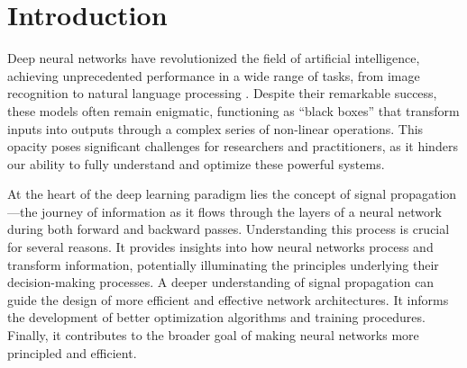 \chapter{Introduction}

Deep neural networks have revolutionized the field of artificial intelligence, achieving unprecedented performance in a wide range of tasks, from image recognition to natural language processing \cite{zhang2019root}. Despite their remarkable success, these models often remain enigmatic, functioning as ``black boxes'' that transform inputs into outputs through a complex series of non-linear operations. This opacity poses significant challenges for researchers and practitioners, as it hinders our ability to fully understand and optimize these powerful systems.

At the heart of the deep learning paradigm lies the concept of signal propagation—the journey of information as it flows through the layers of a neural network during both forward and backward passes. Understanding this process is crucial for several reasons. It provides insights into how neural networks process and transform information, potentially illuminating the principles underlying their decision-making processes. A deeper understanding of signal propagation can guide the design of more efficient and effective network architectures. It informs the development of better optimization algorithms and training procedures. Finally, it contributes to the broader goal of making neural networks more principled and efficient.